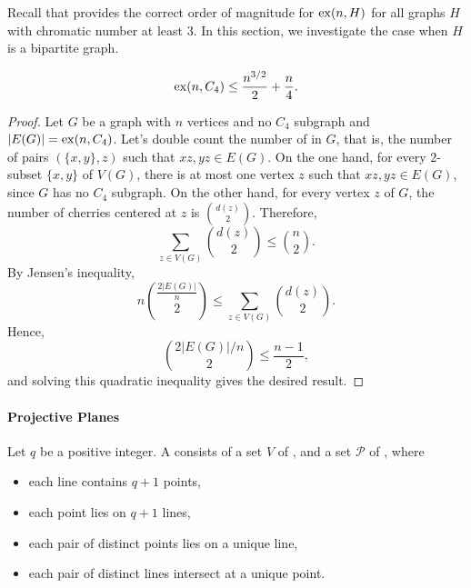 Recall that  provides the correct order of magnitude for \(\operatorname{ex}(n, H)\) for all graphs \(H\) with chromatic number at least \(3\).
In this section, we investigate the case when \(H\) is a bipartite graph.

\begin{theorem}
    \begin{equation}
        \operatorname{ex}(n, C_4) \leq \frac{n^{3/2}}{2} + \frac{n}{4}.
    \end{equation}
\end{theorem}

\begin{proof}
    Let \(G\) be a graph with \(n\) vertices and no \(C_4\) subgraph
    and \(|E(G)| = \operatorname{ex}(n, C_4)\).
    Let's double count the number of  in \(G\),
    that is, the number of pairs \((\{x, y\}, z)\) such that \(xz, yz \in E(G)\).
    On the one hand, for every \(2\)-subset \(\{x, y\}\) of \(V(G)\),
    there is at most one vertex \(z\) such that \(xz, yz \in E(G)\),
    since \(G\) has no \(C_4\) subgraph.
    On the other hand, for every vertex \(z\) of \(G\),
    the number of cherries centered at \(z\) is \(\binom{d(z)}{2}\).
    Therefore, 
    \begin{equation}
        \sum_{z \in V(G)} \binom{d(z)}{2} \leq \binom{n}{2}.
    \end{equation}
    By Jensen's inequality,
    \begin{equation}
        n\binom{\frac{2|E(G)|}{n}}{2} \leq \sum_{z \in V(G)} \binom{d(z)}{2}.
    \end{equation}
    Hence,
    \begin{equation}
        \binom{2|E(G)|/n}{2} \leq \frac{n-1}{2},
    \end{equation}
    and solving this quadratic inequality gives the desired result.
\end{proof}

\paragraph{Projective Planes}

\begin{definition}
    Let \(q\) be a positive integer.
    A  consists of a set \(V\) of , and a set \(\mathcal{P}\) of ,
    where
    \begin{itemize}
        \item \label{def:projective-plane-1} each line contains \(q+1\) points,
        \item \label{def:projective-plane-2} each point lies on \(q+1\) lines,
        \item \label{def:projective-plane-3} each pair of distinct points lies on a unique line,
        \item \label{def:projective-plane-4} each pair of distinct lines intersect at a unique point.
    \end{itemize}
\end{definition}


